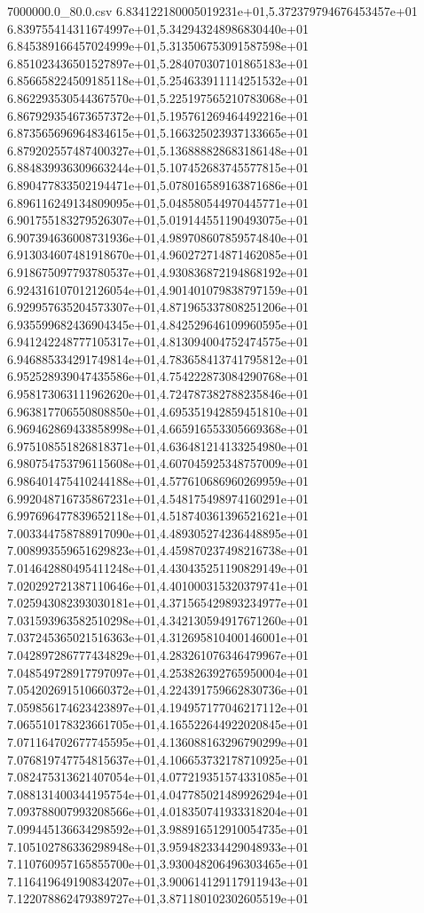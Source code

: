 \begin{filecontents*}{7000000.0_80.0.csv}
6.834122180005019231e+01,5.372379794676453457e+01
6.839755414311674997e+01,5.342943248986830440e+01
6.845389166457024999e+01,5.313506753091587598e+01
6.851023436501527897e+01,5.284070307101865183e+01
6.856658224509185118e+01,5.254633911114251532e+01
6.862293530544367570e+01,5.225197565210783068e+01
6.867929354673657372e+01,5.195761269464492216e+01
6.873565696964834615e+01,5.166325023937133665e+01
6.879202557487400327e+01,5.136888828683186148e+01
6.884839936309663244e+01,5.107452683745577815e+01
6.890477833502194471e+01,5.078016589163871686e+01
6.896116249134809095e+01,5.048580544970445771e+01
6.901755183279526307e+01,5.019144551190493075e+01
6.907394636008731936e+01,4.989708607859574840e+01
6.913034607481918670e+01,4.960272714871462085e+01
6.918675097793780537e+01,4.930836872194868192e+01
6.924316107012126054e+01,4.901401079838797159e+01
6.929957635204573307e+01,4.871965337808251206e+01
6.935599682436904345e+01,4.842529646109960595e+01
6.941242248777105317e+01,4.813094004752474575e+01
6.946885334291749814e+01,4.783658413741795812e+01
6.952528939047435586e+01,4.754222873084290768e+01
6.958173063111962620e+01,4.724787382788235846e+01
6.963817706550808850e+01,4.695351942859451810e+01
6.969462869433858998e+01,4.665916553305669368e+01
6.975108551826818371e+01,4.636481214133254980e+01
6.980754753796115608e+01,4.607045925348757009e+01
6.986401475410244188e+01,4.577610686960269959e+01
6.992048716735867231e+01,4.548175498974160291e+01
6.997696477839652118e+01,4.518740361396521621e+01
7.003344758788917090e+01,4.489305274236448895e+01
7.008993559651629823e+01,4.459870237498216738e+01
7.014642880495411248e+01,4.430435251190829149e+01
7.020292721387110646e+01,4.401000315320379741e+01
7.025943082393030181e+01,4.371565429893234977e+01
7.031593963582510298e+01,4.342130594917671260e+01
7.037245365021516363e+01,4.312695810400146001e+01
7.042897286777434829e+01,4.283261076346479967e+01
7.048549728917797097e+01,4.253826392765950004e+01
7.054202691510660372e+01,4.224391759662830736e+01
7.059856174623423897e+01,4.194957177046217112e+01
7.065510178323661705e+01,4.165522644922020845e+01
7.071164702677745595e+01,4.136088163296790299e+01
7.076819747754815637e+01,4.106653732178710925e+01
7.082475313621407054e+01,4.077219351574331085e+01
7.088131400344195754e+01,4.047785021489926294e+01
7.093788007993208566e+01,4.018350741933318204e+01
7.099445136634298592e+01,3.988916512910054735e+01
7.105102786336298948e+01,3.959482334429048933e+01
7.110760957165855700e+01,3.930048206496303465e+01
7.116419649190834207e+01,3.900614129117911943e+01
7.122078862479389727e+01,3.871180102302605519e+01

\end{filecontents*}
